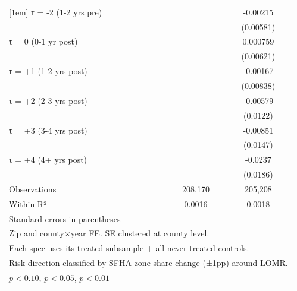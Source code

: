 \begin{table}[htbp]
\begin{tabular}{l*{2}{c}}
[1em]
τ = -2 (1-2 yrs pre)&                     &    -0.00215         \\
                    &                     &   (0.00581)         \\
[1em]
τ = 0 (0-1 yr post) &                     &    0.000759         \\
                    &                     &   (0.00621)         \\
[1em]
τ = +1 (1-2 yrs post)&                     &    -0.00167         \\
                    &                     &   (0.00838)         \\
[1em]
τ = +2 (2-3 yrs post)&                     &    -0.00579         \\
                    &                     &    (0.0122)         \\
[1em]
τ = +3 (3-4 yrs post)&                     &    -0.00851         \\
                    &                     &    (0.0147)         \\
[1em]
τ = +4 (4+ yrs post)&                     &     -0.0237         \\
                    &                     &    (0.0186)         \\
\hline
Observations        &     208,170         &     205,208         \\
Within R²           &      0.0016         &      0.0018         \\
\hline\hline
\multicolumn{3}{l}{\footnotesize Standard errors in parentheses}\\
\multicolumn{3}{l}{\footnotesize Zip and county×year FE. SE clustered at county level.}\\
\multicolumn{3}{l}{\footnotesize Each spec uses its treated subsample + all never-treated controls.}\\
\multicolumn{3}{l}{\footnotesize Risk direction classified by SFHA zone share change (±1pp) around LOMR.}\\
\multicolumn{3}{l}{\footnotesize \sym{*} \(p<0.10\), \sym{**} \(p<0.05\), \sym{***} \(p<0.01\)}\\
\end{tabular}
\end{table}

